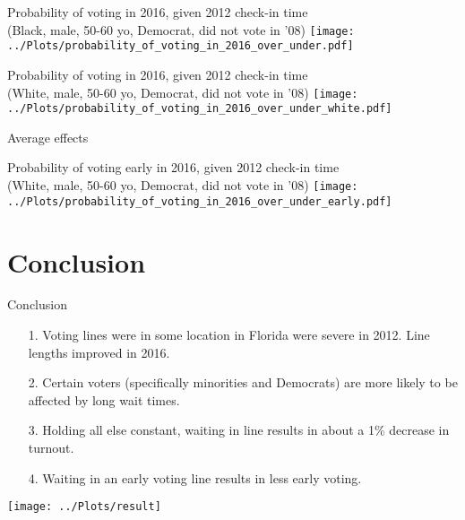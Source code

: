 \documentclass{beamer}
\begin{document}
		\begin{frame}				
			\centering
			Probability of voting in 2016, given 2012 check-in time \\
			(Black, male, 50-60 yo, Democrat, did not vote in '08)
			\texttt{[image: ../Plots/probability\_of\_voting\_in\_2016\_over\_under.pdf]}
		\end{frame}
		
		
		\begin{frame}				
                  \centering
			Probability of voting in 2016, given 2012 check-in time \\
			(White, male, 50-60 yo, Democrat, did not vote in '08)
			\texttt{[image: ../Plots/probability\_of\_voting\_in\_2016\_over\_under\_white.pdf]}
                      \end{frame}
                
                
                      \begin{frame}	
Average effects
                  \footnotesize
              \end{frame}
              

		\begin{frame}				
                  \centering
			Probability of voting early in 2016, given 2012 check-in time \\
			(White, male, 50-60 yo, Democrat, did not vote in '08)
			\texttt{[image: ../Plots/probability\_of\_voting\_in\_2016\_over\_under\_early.pdf]}
                      \end{frame}




              \section{Conclusion}
	
		\begin{frame}
			Conclusion
			\begin{itemize}
				\item[1.] Voting lines were in some location in Florida were severe in 2012.  Line lengths improved in 2016.
				\item[2.] Certain voters (specifically minorities and Democrats) are more likely to be affected by long wait times. 
				\item[3.] Holding all else constant,
                                  waiting in line results in about a
                                  1\% decrease in turnout.
				\item[4.] Waiting in an early voting line
                                  results in less early voting.
			\end{itemize}
		\end{frame}
		
		\begin{frame}
		\centering
			\texttt{[image: ../Plots/result]}
		\end{frame}
		
			
\end{document}
